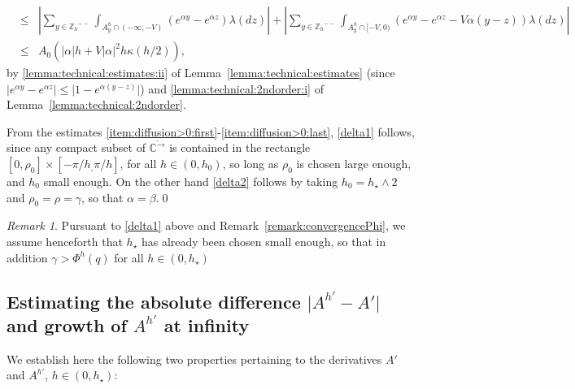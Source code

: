 \documentclass[pdftex,oneside,11pt,reqno]{amsart}
\theoremstyle{definition}
\theoremstyle{theorem}
\theoremstyle{remark}
\newtheorem{remark}{Remark}[section]
\numberwithin{equation}{section}
\numberwithin{definition}{section}
\begin{document}
\begin{enumerate}[(1)]
\begin{eqnarray*}
&\leq& \left\vert\!\sum_{y\in {\mathbb{Z}_h}^{--}}\int_{A^h_y\cap (-\infty,-V)}\left(e^{\alpha y}-e^{\alpha z}\right){\lambda}(dz)\right\vert+\left\vert\sum_{y\in {\mathbb{Z}_h}^{--}}\!\int_{A^h_y\cap [-V,0)}\left(e^{\alpha y}-e^{\alpha z}-V\alpha (y-z) \right){\lambda}(dz)\right\vert\\
&\leq&A_0\left(\vert\alpha \vert h+V\vert \alpha\vert^2h\kappa(h/2)\right),
\end{eqnarray*}
by \ref{lemma:technical:estimates:ii} of Lemma~\ref{lemma:technical:estimates} (since $\vert e^{\alpha y}-e^{\alpha z}\vert\leq \vert 1-e^{\alpha (y-z)}\vert$) and \ref{lemma:technical:2ndorder:i} of Lemma~\ref{lemma:technical:2ndorder}.
\end{enumerate}
From the estimates \ref{item:diffusion>0:first}-\ref{item:diffusion>0:last}, \ref{delta1} follows, since any compact subset of ${\overline{\mathbb{C}^{\rightarrow}}}$ is contained in the rectangle $[0,\rho_0]\times [-\pi/h_,\pi/h]$, for all $h\in (0,h_0)$, so long as $\rho_0$ is chosen large enough, and $h_0$ small enough. On the other hand \ref{delta2} follows by taking $h_0=h_\star\land 2$ and $\rho_0=\rho=\gamma$, so that $\alpha=\beta$.\qed

\begin{remark}
Pursuant to \ref{delta1} above and Remark~\ref{remark:convergencePhi}, we assume henceforth that $h_\star$ has already been chosen small enough, so that in addition $\gamma>\Phi^h(q)$ for all $h\in (0,h_\star)$
\end{remark}

\subsection{Estimating the absolute difference $\vert A^{h\prime}-A'\vert$ and growth of $A^{h\prime}$ at infinity}\label{subsection:_the_difference_of_derivatives}
We establish here the following two properties pertaining to the derivatives $A'$ and $A^{h\prime}$, $h\in (0,h_\star)$:
\end{document}
